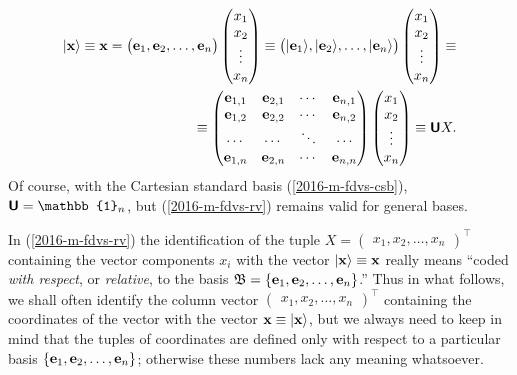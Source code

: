 \begin{equation}
\begin{split}
\vert {\bf x} \rangle \equiv {\bf x} =
\begin{pmatrix}{\bf e}_1,{\bf e}_2, \ldots , {\bf e}_n\end{pmatrix}
\begin{pmatrix} x_1\\x_2\\ \vdots \\ x_n \end{pmatrix}
\equiv
\begin{pmatrix} \vert {\bf e}_1\rangle ,\vert {\bf e}_2 \rangle ,  \ldots , \vert {\bf e}_n\rangle \end{pmatrix}
\begin{pmatrix} x_1\\x_2\\ \vdots \\ x_n \end{pmatrix} \equiv
\\
\equiv
\begin{pmatrix}
{\bf e}_{1,1} &   {\bf e}_{2,1}  &  \cdots &  {\bf e}_{n,1}\\
{\bf e}_{1,2} &   {\bf e}_{2,2}  &  \cdots &  {\bf e}_{n,2}\\
\cdots  & \cdots  &  \ddots &  \cdots \\
{\bf e}_{1,n} &   {\bf e}_{2,n}  &  \cdots &  {\bf e}_{n,n}\\
\end{pmatrix}
\begin{pmatrix} x_1\\x_2\\ \vdots \\ x_n \end{pmatrix}
\equiv
\textsf{\textbf{U}} X
 .
\label{2016-m-fdvs-rv}
\end{split}
\end{equation}
Of course, with the Cartesian standard basis (\ref{2016-m-fdvs-csb}), $\textsf{\textbf{U}} = \mathbb{1}_n$, but
(\ref{2016-m-fdvs-rv}) remains valid for general bases.


In (\ref{2016-m-fdvs-rv}) the identification of the tuple
$ X = \begin{pmatrix}
x_1, x_2, \ldots , x_n
\end{pmatrix}^\intercal
$
containing the vector components $x_i$
with the vector $\vert {\bf x} \rangle \equiv {\bf x}$
really means
``coded {\em with respect}, or {\em relative},  to the basis ${\frak B}=\{{\bf e}_1,{\bf e}_2, \ldots , {\bf e}_n\}$.''
Thus in what follows, we shall often identify the column vector
$
\begin{pmatrix}
x_1, x_2, \ldots , x_n
\end{pmatrix}^\intercal
$
containing the coordinates of the vector
with the vector ${\bf x}\equiv \vert {\bf x} \rangle$, but we always need to keep in mind that
the tuples of coordinates are defined only with respect to a particular basis
$\{ {\bf e}_1,{\bf e}_2, \ldots , {\bf e}_n \}$; otherwise these numbers lack any meaning whatsoever.

